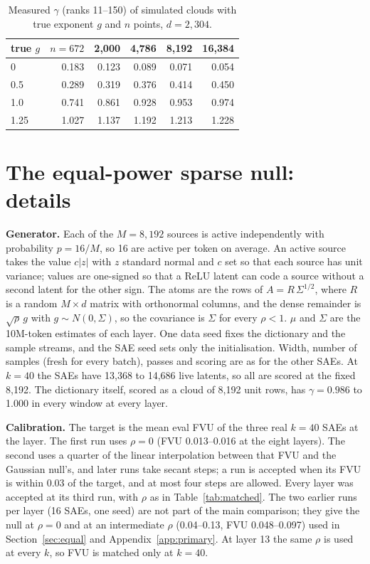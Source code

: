 \documentclass[10pt,twocolumn]{article}
\newcommand{\Sig}{\Sigma}
\begin{document}
\begin{table}[!htb]
\centering
\caption{Measured $\gamma$ (ranks 11--150) of simulated clouds with true exponent $g$ and $n$ points, $d=2{,}304$.}
\label{tab:live}
\small
\begin{tabular}{l rrrrr}
\toprule
true $g$ & $n=672$ & 2,000 & 4,786 & 8,192 & 16,384 \\
\midrule
0 & 0.183 & 0.123 & 0.089 & 0.071 & 0.054 \\
0.5 & 0.289 & 0.319 & 0.376 & 0.414 & 0.450 \\
1.0 & 0.741 & 0.861 & 0.928 & 0.953 & 0.974 \\
1.25 & 1.027 & 1.137 & 1.192 & 1.213 & 1.228 \\
\bottomrule
\end{tabular}
\end{table}

\section{The equal-power sparse null: details}
\label{app:sparse2}

\textbf{Generator.} Each of the $M=8{,}192$ sources is active independently with probability $p=16/M$, so 16 are active per token on average. An active source takes the value $c|z|$ with $z$ standard normal and $c$ set so that each source has unit variance; values are one-signed so that a ReLU latent can code a source without a second latent for the other sign. The atoms are the rows of $A=R\,\Sig^{1/2}$, where $R$ is a random $M \times d$ matrix with orthonormal columns, and the dense remainder is $\sqrt{\rho}\,g$ with $g \sim N(0,\Sig)$, so the covariance is $\Sig$ for every $\rho<1$. $\mu$ and $\Sig$ are the 10M-token estimates of each layer. One data seed fixes the dictionary and the sample streams, and the SAE seed sets only the initialisation. Width, number of samples (fresh for every batch), passes and scoring are as for the other SAEs. At $k=40$ the SAEs have 13,368 to 14,686 live latents, so all are scored at the fixed 8,192. The dictionary itself, scored as a cloud of 8,192 unit rows, has $\gamma=0.986$ to 1.000 in every window at every layer.

\textbf{Calibration.} The target is the mean eval FVU of the three real $k=40$ SAEs at the layer. The first run uses $\rho=0$ (FVU 0.013--0.016 at the eight layers). The second uses a quarter of the linear interpolation between that FVU and the Gaussian null's, and later runs take secant steps; a run is accepted when its FVU is within 0.03 of the target, and at most four steps are allowed. Every layer was accepted at its third run, with $\rho$ as in Table~\ref{tab:matched}. The two earlier runs per layer (16 SAEs, one seed) are not part of the main comparison; they give the null at $\rho=0$ and at an intermediate $\rho$ (0.04--0.13, FVU 0.048--0.097) used in Section~\ref{sec:equal} and Appendix~\ref{app:primary}. At layer 13 the same $\rho$ is used at every $k$, so FVU is matched only at $k=40$.
\end{document}
